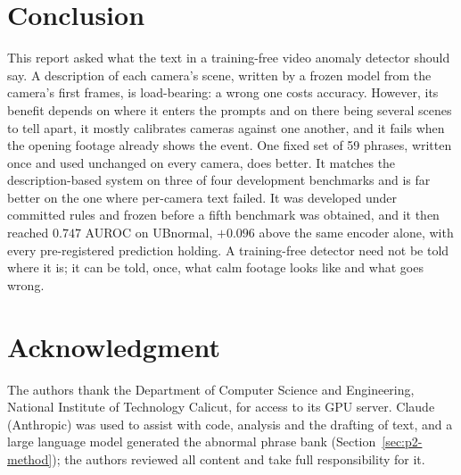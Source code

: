 \documentclass[conference,a4paper]{IEEEtran}
\begin{document}
\section{Conclusion}
\label{sec:conclusion}

This report asked what the text in a training-free video anomaly detector should
say. A description of each camera's scene, written by a frozen model from the
camera's first frames, is load-bearing: a wrong one costs accuracy. However, its
benefit depends on where it enters the prompts and on there being several scenes
to tell apart, it mostly calibrates cameras against one another, and it fails
when the opening footage already shows the event. One fixed set of 59 phrases,
written once and used unchanged on every camera, does better. It matches the
description-based system on three of four development benchmarks and is far
better on the one where per-camera text failed. It was developed under committed
rules and frozen before a fifth benchmark was obtained, and it then reached
$0.747$ AUROC on UBnormal, $+0.096$ above the same encoder alone, with every
pre-registered prediction holding. A training-free detector need not be told
where it is; it can be told, once, what calm footage looks like and what goes
wrong.

\section*{Acknowledgment}
The authors thank the Department of Computer Science and Engineering, National
Institute of Technology Calicut, for access to its GPU server.
Claude (Anthropic) was used to assist with code, analysis and the drafting of
text, and a large language model generated the abnormal phrase bank
(Section~\ref{sec:p2-method}); the authors reviewed all content and take full
responsibility for it.



\end{document}
